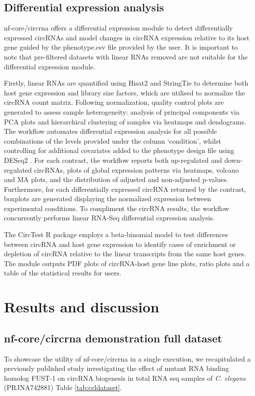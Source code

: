 \documentclass{bmcart}
\begin{document}
\subsection*{\textbf{Differential expression analysis}}
nf-core/circrna offers a differential expression module to detect differentially expressed circRNAs and model changes in circRNA expression relative to its host gene guided by the phenotype.csv file provided by the user. It is important to note that pre-filtered datasets with linear RNAs removed are not suitable for the differential expression module. \par Firstly, linear RNAs are quantified using Hisat2 \cite{hisat2} and StringTie \cite{StringTie} to determine both host gene expression and library size factors, which are utilised to normalize the circRNA count matrix. Following normalization, quality control plots are generated to assess sample heterogeneity: analysis of principal components via PCA plots and hierarchical clustering of samples via heatmaps and dendograms. The workflow automates differential expression analysis for all possible combinations of the levels provided under the column `condition', whilst controlling for additional covariates added to the phenotype design file using DESeq2 \cite{DESeq2}. For each contrast, the workflow reports both up-regulated and down-regulated circRNAs, plots of global expression patterns via heatmaps, volcano and MA plots, and the distribution of adjusted and non-adjusted p-values. Furthermore, for each differentially expressed circRNA returned by the contrast, boxplots are generated displaying the normalized expression between experimental conditions. To compliment the circRNA results, the workflow concurrently performs linear RNA-Seq differential expression analysis. \par
The CircTest \cite{Jakobi2019Jul} R package employs a beta-binomial model to test differences between circRNA and host gene expression to identify cases of enrichment or depletion of circRNA relative to the linear transcripts from the same host genes. The module outputs PDF plots of circRNA-host gene line plots, ratio plots and a table of the statistical results for users.

\section*{Results and discussion}
\subsection*{\textbf{nf-core/circrna demonstration full dataset}}
To showcase the utility of nf-core/circrna in a single execution, we recapitulated a previously published study investigating the effect of mutant RNA binding homolog FUST-1 on circRNA biogenesis in total RNA seq samples of \textit{C. elegans} (PRJNA742881) \cite{Cao2021Nov} Table \ref{tab:celdataset}. \par
\end{document}
